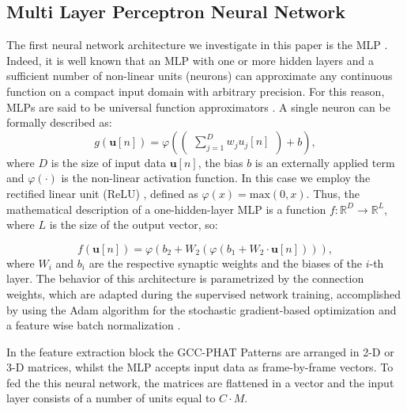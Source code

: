 \documentclass[review]{elsarticle}
\begin{document}
\subsection{Multi Layer Perceptron Neural Network}
\label{sec:MLP}
The first neural network architecture we investigate in this paper is the MLP \cite{Rumelhart86-LRB}. Indeed, it is well known that an  MLP with one or more hidden layers and a sufficient number of non-linear units (neurons) can  approximate any continuous  function  on  a  compact  input  domain  with arbitrary precision. For this reason, MLPs are said to be universal function approximators \cite{hornik1989multilayer}. A single neuron can be formally described as:
\begin{equation}
g(\mathbf{u}[n])=\varphi \left(\left(\begin{matrix} \sum _{ j=1 }^{ D }{w_j u_j[n] }  \end{matrix} \right) + b\right),
\end{equation}
where $D$ is the size of input data $\mathbf{u}[n]$, the bias $b$ is an externally applied term and $\varphi(\cdot)$ is the non-linear activation function. In this case we employ the rectified linear unit (ReLU) \cite{nair2010rectified}, defined as $\varphi(x) = \text{max}(0,x)$.
Thus, the mathematical description of a one-hidden-layer MLP is a function $f:\mathbb{R}^D \rightarrow \mathbb{R}^L$, where $L$ is the size of the output vector, so:

\begin{equation}
f(\mathbf{u}[n]) = 	\varphi \left( b_2 + W_2 \left( \varphi \left( b_1 + W_2 \cdot \mathbf{u}[n]\right) \right) \right),
\end{equation}
where $W_i$ and $b_{i}$ are the respective synaptic weights and the biases of the $i$-th layer.
The  behavior  of  this architecture  is  parametrized  by  the connection weights, which are adapted during the supervised network training, accomplished by using the Adam algorithm \cite{kingma2014adam} for the stochastic gradient-based optimization and a feature wise batch normalization \cite{ioffe2015batch}.

In the feature extraction block the GCC-PHAT Patterns are arranged in 2-D or 3-D matrices, whilst the MLP accepts input data as frame-by-frame vectors. To fed the this neural network, the matrices are flattened in a vector and the input layer consists of a number of units equal to $C\cdot M$.
\end{document}
